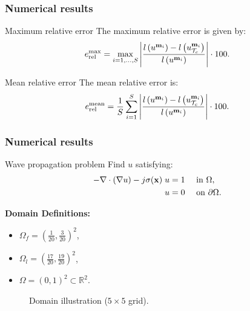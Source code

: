 \begin{frame}
  \frametitle{Numerical results}

  \begin{block}{Maximum relative error}
    The maximum relative error is given by:
\begin{equation}
e_{\textrm{rel}}^{\textrm{max}} = \max_{i=1,\ldots,S} \left| \frac{l\left(u^{\mathbf{m}_{i}}\right) - l\left(u^{\mathbf{m}_{i}}_{\mathcal{T}_{c}}\right)}{l\left(u^{\mathbf{m}_{i}}\right)} \right| \cdot 100.
\label{eq:maxrelerrorqoimago}
\end{equation}

  \end{block}
  
  \begin{block}{Mean relative error}
    The mean relative error is:
\begin{equation}
e_{\textrm{rel}}^{\textrm{mean}} = \frac{1}{S} \sum_{i=1}^S \left| \frac{l\left(u^{\mathbf{m}_{i}}\right) - l\left(u^{\mathbf{m}_{i}}_{\mathcal{T}_{c}}\right)}{l\left(u^{\mathbf{m}_{i}}\right)} \right| \cdot 100.
\label{eq:meanrelerrorqoimago}
\end{equation}
  \end{block}
 \end{frame}
 
 \begin{frame}
    \frametitle{Numerical results}
 \begin{block}{Wave propagation problem}
     Find \(u\) satisfying:
    \begin{alignat}{2}
      - \nabla \cdot \left(\nabla u\right) -  j \sigma(\x) \; u   & = 1 &  & \text{ in } \Omega, \\
    						              u   & = 0 &  & \text{ on } {\partial \Omega}.
    \end{alignat}
  \end{block}
  
\begin{multicols}{2}
    \textbf{Domain Definitions:}
    \begin{itemize}
      \item \(\Omega_f = \left(\frac{1}{20}, \frac{3}{20}\right)^{2}\), 
      \item \(\Omega_l = \left(\frac{17}{20}, \frac{19}{20}\right)^{2}\),
      \item \(\Omega = \left(0,1\right)^{2} \subset \mathbb{R}^{2}\).
    \end{itemize}

   \begin{figure}
      \centering
      
      \caption{Domain illustration ($5 \times 5$ grid).}
    \end{figure}

  \end{multicols}
\end{frame}

